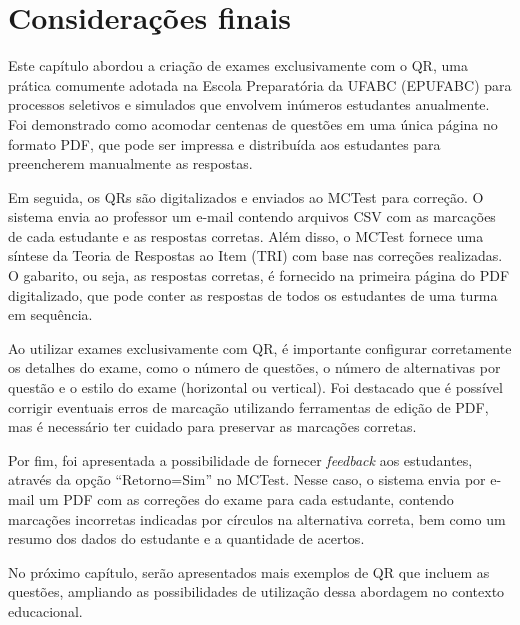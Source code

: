 \section{Considerações finais}

Este capítulo abordou a criação de exames exclusivamente com o QR, uma prática comumente adotada na Escola Preparatória da UFABC (EPUFABC) para processos seletivos e simulados que envolvem inúmeros estudantes anualmente. Foi demonstrado como acomodar centenas de questões em uma única página no formato PDF, que pode ser impressa e distribuída aos estudantes para preencherem manualmente as respostas.

Em seguida, os QRs são digitalizados e enviados ao MCTest para correção. O sistema envia ao professor um e-mail contendo arquivos CSV com as marcações de cada estudante e as respostas corretas. Além disso, o MCTest fornece uma síntese da Teoria de Respostas ao Item (TRI) com base nas correções realizadas. O gabarito, ou seja, as respostas corretas, é fornecido na primeira página do PDF digitalizado, que pode conter as respostas de todos os estudantes de uma turma em sequência.

Ao utilizar exames exclusivamente com QR, é importante configurar corretamente os detalhes do exame, como o número de questões, o número de alternativas por questão e o estilo do exame (horizontal ou vertical). Foi destacado que é possível corrigir eventuais erros de marcação utilizando ferramentas de edição de PDF, mas é necessário ter cuidado para preservar as marcações corretas.

Por fim, foi apresentada a possibilidade de fornecer \textit{feedback} aos estudantes, através da opção ``Retorno=Sim'' no MCTest. Nesse caso, o sistema envia por e-mail um PDF com as correções do exame para cada estudante, contendo marcações incorretas indicadas por círculos na alternativa correta, bem como um resumo dos dados do estudante e a quantidade de acertos.

No próximo capítulo, serão apresentados mais exemplos de QR que incluem as questões, ampliando as possibilidades de utilização dessa abordagem no contexto educacional.

















